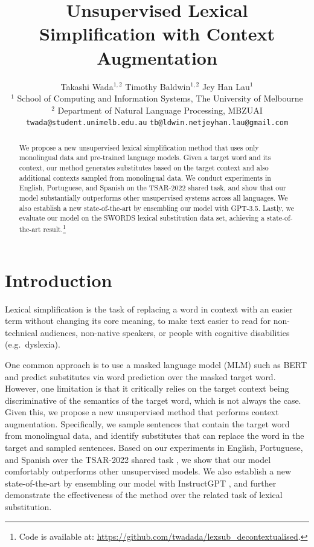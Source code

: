 \documentclass[11pt]{article}
\title{Unsupervised Lexical Simplification with Context Augmentation}
\author{Takashi Wada$^{1,2}$ \qquad
Timothy Baldwin$^{1,2}$ \qquad
Jey Han Lau$^{1}$ \\
    $^1$ School of Computing and Information Systems, The University of Melbourne \\
    $^2$ Department of Natural Language Processing, MBZUAI \\[0ex]
    \texttt{twada@student.unimelb.edu.au} \qquad \texttt{tb@ldwin.net}\qquad \texttt{jeyhan.lau@gmail.com}
    }
\begin{document}
\maketitle
\begin{abstract}
We propose a new unsupervised lexical simplification method that uses only monolingual data and pre-trained language models. Given a target word and its context, our method generates substitutes based on the target context and also additional contexts sampled from monolingual data. We conduct experiments in English, Portuguese, and Spanish on the TSAR-2022 shared task, and show that our model substantially outperforms other unsupervised systems across all languages. We also establish a new state-of-the-art by ensembling our model with GPT-3.5. Lastly, we evaluate our model on the SWORDS lexical substitution data set, achieving a state-of-the-art result.\footnote{Code is available at: \url{https://github.com/twadada/lexsub_decontextualised}.}
\end{abstract}

\section{Introduction}
Lexical simplification is the task of replacing a word in context with an easier term without changing its core meaning, to make text easier to read for non-technical audiences, non-native speakers, or people with cognitive disabilities (e.g.\ dyslexia).

One common approach \cite{li-etal-2022-mantis,qiang2020BERTLS,DBLP:journals/corr/abs-2006-14939} is to use a masked language model (MLM) such as BERT \cite{bert} and predict substitutes via word prediction over the masked target word. However, one limitation is that it critically relies on the target context being discriminative of the semantics of the target word, which is not always the case. Given this, we propose a new unsupervised method that performs context augmentation. Specifically, we sample sentences that contain the target word from monolingual data, and identify substitutes that can replace the word in the target and sampled sentences. Based on our experiments in English, Portuguese, and Spanish over the TSAR-2022 shared task \cite{saggion-etal-2022-findings}, we show that our model comfortably outperforms other unsupervised models. We also establish a new state-of-the-art by ensembling our model with InstructGPT \cite{gpt-3.5}, and further demonstrate the effectiveness of the method over the related task of lexical substitution.
\end{document}
